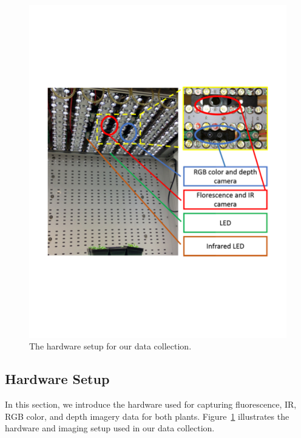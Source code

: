 \begin{figure}
  \includegraphics[width=0.95\linewidth]{Figures/hardware}
\caption{The hardware setup for our data collection.}
\label{fig:hardware}
\end{figure}

\subsection{Hardware Setup}
In this section, we introduce the hardware used for capturing fluorescence, IR, RGB color, and depth imagery data for both plants.
Figure~\ref{fig:hardware} illustrates the hardware and imaging setup used in our data collection.


